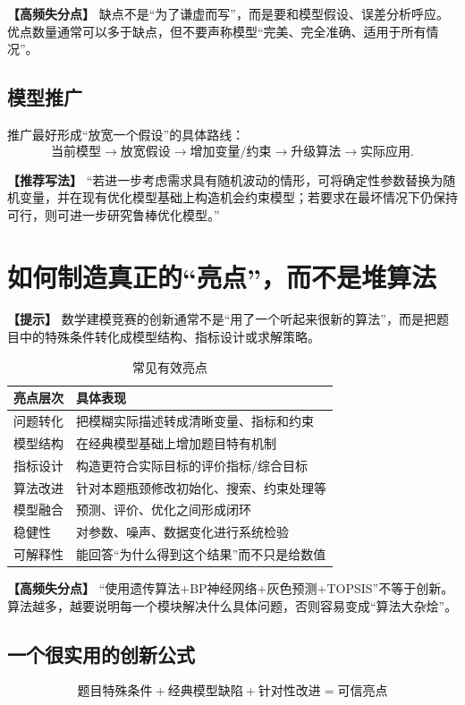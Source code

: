 \documentclass[12pt,a4paper]{article}
\newcommand{\tip}[1]{\par\noindent\textbf{【提示】} #1\par}
\newcommand{\warning}[1]{\par\noindent\textbf{【高频失分点】} #1\par}
\newcommand{\good}[1]{\par\noindent\textbf{【推荐写法】} #1\par}
\begin{document}
\warning{缺点不是“为了谦虚而写”，而是要和模型假设、误差分析呼应。优点数量通常可以多于缺点，但不要声称模型“完美、完全准确、适用于所有情况”。}

\subsection{模型推广}

推广最好形成“放宽一个假设”的具体路线：
\[
\text{当前模型}
\rightarrow\text{放宽假设}
\rightarrow\text{增加变量/约束}
\rightarrow\text{升级算法}
\rightarrow\text{实际应用}.
\]

\good{“若进一步考虑需求具有随机波动的情形，可将确定性参数替换为随机变量，并在现有优化模型基础上构造机会约束模型；若要求在最坏情况下仍保持可行，则可进一步研究鲁棒优化模型。”}

\section{如何制造真正的“亮点”，而不是堆算法}

\tip{数学建模竞赛的创新通常不是“用了一个听起来很新的算法”，而是把题目中的特殊条件转化成模型结构、指标设计或求解策略。}

\begin{table}[H]
\centering
\caption{常见有效亮点}
\begin{tabular}{p{3.5cm}p{9cm}}
\toprule
亮点层次 & 具体表现 \\
\midrule
问题转化 & 把模糊实际描述转成清晰变量、指标和约束 \\
模型结构 & 在经典模型基础上增加题目特有机制 \\
指标设计 & 构造更符合实际目标的评价指标/综合目标 \\
算法改进 & 针对本题瓶颈修改初始化、搜索、约束处理等 \\
模型融合 & 预测、评价、优化之间形成闭环 \\
稳健性 & 对参数、噪声、数据变化进行系统检验 \\
可解释性 & 能回答“为什么得到这个结果”而不只是给数值 \\
\bottomrule
\end{tabular}
\end{table}

\warning{“使用遗传算法+BP神经网络+灰色预测+TOPSIS”不等于创新。算法越多，越要说明每一个模块解决什么具体问题，否则容易变成“算法大杂烩”。}

\subsection{一个很实用的创新公式}
\[
\boxed{\text{题目特殊条件}+\text{经典模型缺陷}+\text{针对性改进}=\text{可信亮点}}
\]
\end{document}
